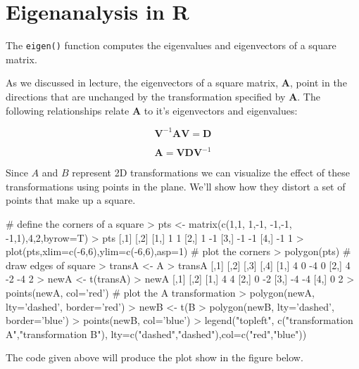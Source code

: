 \section{Eigenanalysis in R}

The \lstinline!eigen()! function computes the eigenvalues and
eigenvectors of a square matrix.

As we discussed in lecture, the eigenvectors of a square matrix,
$$, point in the directions that are unchanged by the
transformation specified by $$. The following relationships
relate $$ to it's eigenvectors and eigenvalues:

\[\mathbf{V}^{-1}\mathbf{A}\mathbf{V}  =  \mathbf{D} \]

\[\mathbf{A}  =  \mathbf{V}\mathbf{D}\mathbf{V}^{-1}\]

Since $A$ and $B$ represent 2D transformations we can visualize the
effect of these transformations using points in the plane. We'll show
how they distort a set of points that make up a square.

\begin{R}
# define the corners of a square
> pts <- matrix(c(1,1, 1,-1, -1,-1, -1,1),4,2,byrow=T)
> pts
     [,1] [,2]
[1,]    1    1
[2,]    1   -1
[3,]   -1   -1
[4,]   -1    1
> plot(pts,xlim=c(-6,6),ylim=c(-6,6),asp=1) # plot the corners
> polygon(pts) # draw edges of square
> transA <- A %
> transA
     [,1] [,2] [,3] [,4]
[1,]    4    0   -4    0
[2,]    4   -2   -4    2
> newA <- t(transA)
> newA
     [,1] [,2]
[1,]    4    4
[2,]    0   -2
[3,]   -4   -4
[4,]    0    2
> points(newA, col='red') # plot the A transformation
> polygon(newA, lty='dashed', border='red') 
> newB <- t(B %
> polygon(newB, lty='dashed', border='blue')  
> points(newB, col='blue')  
> legend("topleft", c("transformation A","transformation B"),
lty=c("dashed","dashed"),col=c("red","blue"))
\end{R}
The code given above will produce the plot show in the figure below.

